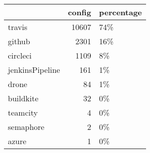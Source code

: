 \begin {table}[h]\begin{tabular}{lrl}
\hline
{} &  config & percentage \\ \hline

travis          &   10607 &        74\% \\ \hline
github          &    2301 &        16\% \\ \hline
circleci        &    1109 &         8\% \\ \hline
jenkinsPipeline &     161 &         1\% \\ \hline
drone           &      84 &         1\% \\ \hline
buildkite       &      32 &         0\% \\ \hline
teamcity        &       4 &         0\% \\ \hline
semaphore       &       2 &         0\% \\ \hline
azure           &       1 &         0\% \\ \hline

\end{tabular}
\end {table}